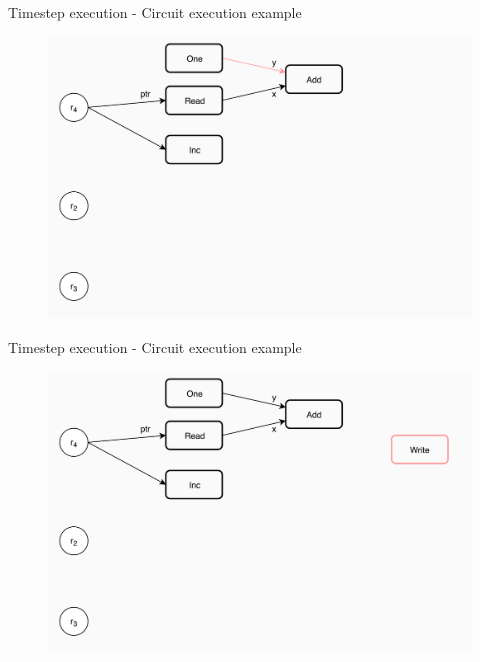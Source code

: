 \documentclass[xcolor={usenames}]{beamer}
\begin{document}
  \begin{frame}{Timestep execution - Circuit execution example}
  	\begin{figure}
  		\centering
  		\includegraphics[width=\textwidth]{../figures/example-circuit-8.png}
  	\end{figure}
  \end{frame}
  \begin{frame}{Timestep execution - Circuit execution example}
  	\begin{figure}
  		\centering
  		\includegraphics[width=\textwidth]{../figures/example-circuit-9.png}
  	\end{figure}
  \end{frame}
\end{document}
